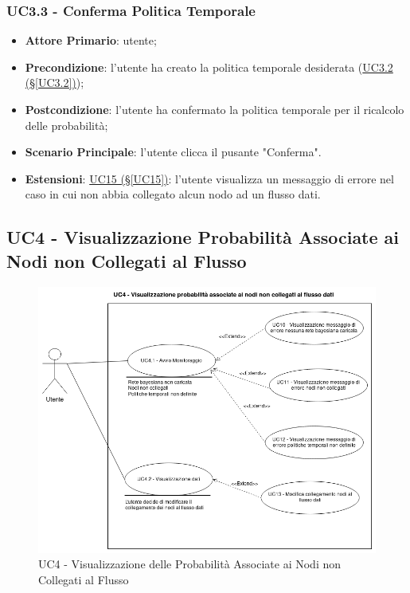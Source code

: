 \subsubsection{UC3.3 - Conferma Politica Temporale}\label{UC3.3}
\begin{itemize}
	\item \textbf{Attore Primario}: utente; 
	\item \textbf{Precondizione}: l'utente ha creato la politica temporale desiderata (\hyperref[UC3.2]{UC3.2 (§\ref*{UC3.2})});
	\item \textbf{Postcondizione}: l'utente ha confermato la politica temporale per il ricalcolo delle probabilità; 
	\item \textbf{Scenario Principale}: l'utente clicca il pusante "Conferma".
	\item \textbf{Estensioni}: \hyperref[UC15]{UC15 (§\ref*{UC15})}: l'utente visualizza un messaggio di errore nel caso in cui non abbia collegato alcun nodo ad un flusso dati.
\end{itemize}

\newpage

\subsection{UC4 - Visualizzazione Probabilità Associate ai Nodi non Collegati al Flusso}\label{UC4}

\begin{figure}[H]
\centering
\includegraphics[scale=0.4]{./images/UC4.png}
\caption{UC4 - Visualizzazione delle Probabilità Associate ai Nodi non Collegati al Flusso}
\end{figure}

